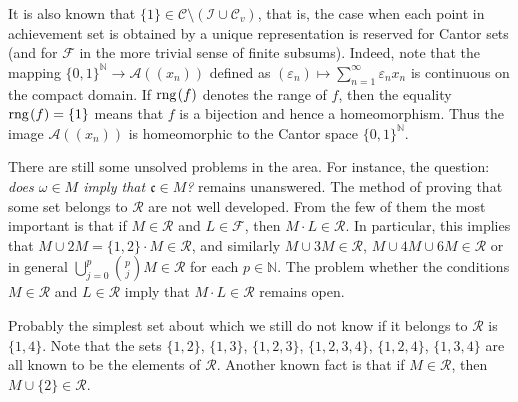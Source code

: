 \documentclass{amsart}
\theoremstyle{definition}
\newcommand{\rng}{{\rm rng} \hspace{0.03cm}}
\newcommand{\Cv}{\mathcal{C}_{v}}
\begin{document}
It is also known that $\{1\}\in \mathcal{C}\setminus(\mathcal{I}\cup \Cv)$, that is, the case when each point in achievement set is obtained by a unique representation is reserved for Cantor sets (and for $\mathcal{F}$ in the more trivial sense of finite subsums). Indeed, note that the mapping $\{0,1\}^{\mathbb{N}} \rightarrow \mathcal{A}((x_n))$ defined as $(\varepsilon_n)\mapsto \sum_{n=1}^{\infty}\varepsilon_n x_n$ is continuous on the compact domain. If $\rng (f)$ denotes the range of $f$, then the equality $\rng(f)=\{1\}$ means that $f$ is a bijection and hence a homeomorphism. Thus the image $\mathcal{A}((x_n))$ is homeomorphic to the Cantor space $\{0,1\}^{\mathbb{N}}$. 

There are still some unsolved problems in the area. For instance, the question: \emph{does $\omega\in M$ imply that $\mathfrak{c}\in M$?} remains unanswered. The method of proving that some set belongs to $\mathcal{R}$ are not well developed. From the few of them the most important is that if $M\in \mathcal{R}$ and $L\in \mathcal{F}$, then $M\cdot L\in \mathcal{R}$. In particular, this implies that $M\cup 2M = \{1,2\}\cdot M\in \mathcal{R}$, and similarly $M\cup 3M\in \mathcal{R}$,  $M\cup 4M\cup 6M\in \mathcal{R}$ or in general $\bigcup_{j=0}^{p} {p\choose j}M\in \mathcal{R}$ for each $p\in\mathbb{N}$. The problem whether the conditions $M\in \mathcal{R}$ and $L\in \mathcal{R}$ imply that $M\cdot L\in \mathcal{R}$ remains open. 

Probably the simplest set about which we still do not know if it belongs to $\mathcal{R}$ is $\{1,4\}$. Note that the sets $\{1,2\}$,  $\{1,3\}$, $\{1,2,3\}$, $\{1,2,3,4\}$, $\{1,2,4\}$, $\{1,3,4\}$  are all known to be the elements of $\mathcal{R}$.
Another known fact is that if $M\in \mathcal{R}$, then $M\cup\{2\}\in \mathcal{R}$. 

\end{document}

